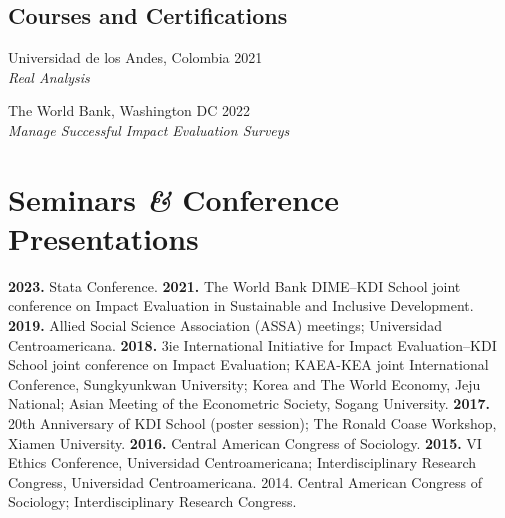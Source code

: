 \documentclass[a4paper, 10pt]{article}
\renewenvironment{itemize}{
  \begin{list}{}
    { \setlength{\itemsep}{5pt}
      \setlength{\parsep}{0pt}
      \setlength{\topsep}{0pt}
      \setlength{\leftmargin}{0em} } }{
  \end{list}}
\begin{document}
\subsection*{Courses and Certifications}
\begin{itemize}
  \item Universidad de los Andes, Colombia \hfill 2021 \\
  {\small \textit{Real Analysis}}
  \item The World Bank, Washington DC \hfill 2022 \\
  {\small \textit{Manage Successful Impact Evaluation Surveys}}
\end{itemize}


\section*{Seminars \textit{\&} Conference Presentations}

\begin{itemize}
  \item \textbf{2023.} Stata Conference. \textbf{2021.} The World Bank DIME--KDI School joint conference on Impact Evaluation in Sustainable and Inclusive Development. \textbf{2019.} Allied Social Science Association (ASSA) meetings; Universidad Centroamericana. \textbf{2018.} 3ie International Initiative for Impact Evaluation--KDI School joint conference on Impact Evaluation; KAEA-KEA joint International Conference, Sungkyunkwan University; Korea and The World Economy, Jeju National; Asian Meeting of the Econometric Society, Sogang University. \textbf{2017.} 20th Anniversary of KDI School (poster session); The Ronald Coase Workshop, Xiamen University. \textbf{2016.} Central American Congress of Sociology. \textbf{2015.} VI Ethics Conference, Universidad Centroamericana; Interdisciplinary Research Congress, Universidad Centroamericana. 2014. Central American Congress of Sociology; Interdisciplinary Research Congress.
\end{itemize}

\end{document}
